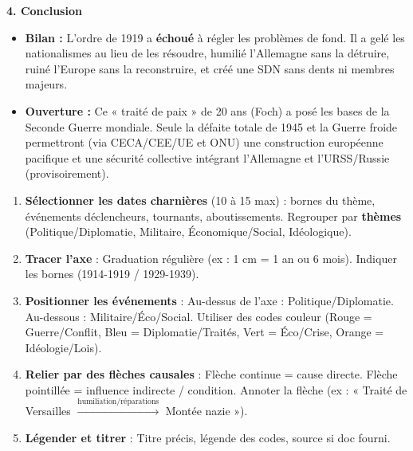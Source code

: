 \documentclass[11pt]{article}
\newcommand{\cle}[1]{{\popxbold\color{popdark}#1}}
\begin{document}
\begin{exoresolu}
\noindent \textbf{4. Conclusion}
\begin{itemize}
\item \textbf{Bilan :} L'ordre de 1919 a \textbf{échoué} à régler les problèmes de fond. Il a gelé les nationalismes au lieu de les résoudre, humilié l'Allemagne sans la détruire, ruiné l'Europe sans la reconstruire, et créé une SDN sans dents ni membres majeurs.
\item \textbf{Ouverture :} Ce « traité de paix » de 20 ans (Foch) a posé les bases de la \cle{Seconde Guerre mondiale}. Seule la défaite totale de 1945 et la Guerre froide permettront (via CECA/CEE/UE et ONU) une construction européenne pacifique et une sécurité collective intégrant l'Allemagne et l'URSS/Russie (provisoirement).
\end{itemize}
\end{exoresolu}

\begin{methode}
\begin{enumerate}
\item \textbf{Sélectionner les dates charnières} (10 à 15 max) : bornes du thème, événements déclencheurs, tournants, aboutissements. Regrouper par \textbf{thèmes} (Politique/Diplomatie, Militaire, Économique/Social, Idéologique).
\item \textbf{Tracer l'axe} : Graduation régulière (ex : 1 cm = 1 an ou 6 mois). Indiquer les bornes (1914-1919 / 1929-1939).
\item \textbf{Positionner les événements} : Au-dessus de l'axe : Politique/Diplomatie. Au-dessous : Militaire/Éco/Social. Utiliser des codes couleur (Rouge = Guerre/Conflit, Bleu = Diplomatie/Traités, Vert = Éco/Crise, Orange = Idéologie/Lois).
\item \textbf{Relier par des flèches causales} : Flèche continue = cause directe. Flèche pointillée = influence indirecte / condition. Annoter la flèche (ex : « Traité de Versailles $\xrightarrow{\text{humiliation/réparations}}$ Montée nazie »).
\item \textbf{Légender et titrer} : Titre précis, légende des codes, source si doc fourni.
\end{enumerate}
\end{methode}
\end{document}
